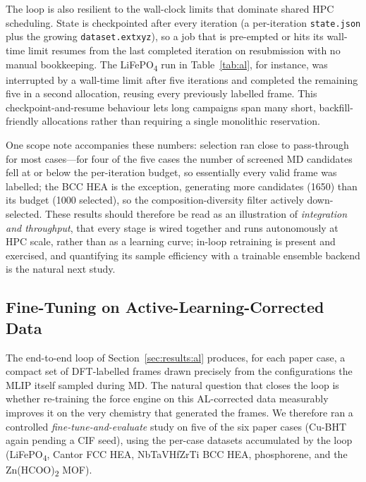 \documentclass[conference]{IEEEtran}
\def\acs#1{#1}%
\begin{document}
The loop is also resilient to the wall-clock limits that dominate shared
\acs{HPC} scheduling. State is checkpointed after every iteration (a
per-iteration \texttt{state.json} plus the growing \texttt{dataset.extxyz}), so
a job that is pre-empted or hits its wall-time limit resumes from the last
completed iteration on resubmission with no manual bookkeeping. The
LiFePO\textsubscript{4} run in Table~\ref{tab:al}, for instance, was interrupted
by a wall-time limit after five iterations and completed the remaining five in a
second allocation, reusing every previously labelled frame. This
checkpoint-and-resume behaviour lets long campaigns span many short,
backfill-friendly allocations rather than requiring a single monolithic
reservation.

One scope note accompanies these numbers: selection ran close to
pass-through for most cases---for four of the five cases the number of screened
\acs{MD} candidates fell at or below the per-iteration budget, so essentially
every valid frame was labelled; the BCC \acs{HEA} is the exception, generating
more candidates (1650) than its budget (1000 selected), so the
composition-diversity filter actively down-selected. These results should
therefore be read as an illustration of
\emph{integration and throughput}, that every stage is wired together and runs
autonomously at \acs{HPC} scale, rather than as a learning curve; in-loop
retraining is present and exercised, and quantifying its sample efficiency with
a trainable ensemble backend is the natural next study.

\subsection{Fine-Tuning on Active-Learning-Corrected Data}
\label{sec:results:finetune}
The end-to-end loop of Section~\ref{sec:results:al} produces, for each paper
case, a compact set of \acs{DFT}-labelled frames drawn precisely from the
configurations the \acs{MLIP} itself sampled during \acs{MD}. The natural
question that closes the loop is whether re-training the force engine on this
\acs{AL}-corrected data measurably improves it on the very chemistry that
generated the frames. We therefore ran a controlled \emph{fine-tune-and-evaluate}
study on five of the six paper cases (Cu-BHT again pending a \acs{CIF} seed),
using the per-case datasets accumulated by the loop
(LiFePO\textsubscript{4}, Cantor FCC \acs{HEA}, NbTaVHfZrTi BCC \acs{HEA},
phosphorene, and the Zn(HCOO)\textsubscript{2} \acs{MOF}).
\end{document}
